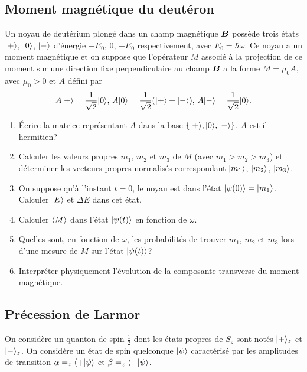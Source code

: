 \subsection{Moment magnétique du deutéron}

Un noyau de deutérium plongé dans un champ magnétique $\boldsymbol{B}$ possède
trois états $\vert+\rangle$, $\vert0\rangle $, $\vert-\rangle$ d'énergie $+E_0$, $0$, $-E_0$
respectivement, avec $E_0=\hbar\omega$. Ce noyau a un moment magnétique et on
suppose que l'opérateur $M$ associé à la projection de ce moment sur une
direction fixe perpendiculaire au champ $\boldsymbol{B}$ a la forme
$M=\mu_0A,$ avec $\mu_0>0$ et $A$ défini par%
\begin{equation}
A\vert+\rangle=\frac{1}{\sqrt{2}}\vert0\rangle,\,A\vert0\rangle=\frac{1}{\sqrt{2}}(\vert+\rangle+\vert-\rangle
),\,A\vert-\rangle =\frac{1}{\sqrt{2}}\vert0\rangle .
\end{equation}

\begin{enumerate}
\item Écrire la matrice représentant $A$ dans la base $\{\vert+\rangle,\vert0\rangle,\vert-\rangle
\}$. $A$ est-il hermitien?

\item Calculer les valeurs propres $m_1$, $m_2$ et $m_3$ de $M$ (avec
$m_1>m_2>m_3$) et déterminer les vecteurs propres normalisés correspondant 
$\vert m_1\rangle$, $\vert m_2\rangle$, $\vert m_3\rangle$.

\item On suppose qu'à l'instant $t=0$, le noyau est dans l'état
$\vert\psi(0)\rangle=\vert m_1\rangle$. Calculer $\vert E\rangle$ et $\Delta E$ dans cet état.

\item Calculer $\langle{M}\rangle$ dans l'état $\vert\psi(t)\rangle$ en fonction de $\omega$.

\item Quelles sont, en fonction de $\omega$, les probabilités de trouver
$m_1$, $m_2$ et $m_3$ lors d'une mesure de $M$ sur l'état $\vert\psi(t)\rangle$?

\item Interpréter physiquement l'évolution de la composante transverse du
moment magnétique.
\end{enumerate}

\subsection{Précession de Larmor}

On considère un quanton de spin $\frac{1}{2}$ dont les états propres de
$S_z$ sont notés $\vert+\rangle_z$ et $\vert-\rangle_z$. On considère un état de spin
quelconque $\vert\psi\rangle$ caractérisé par les amplitudes de transition
$\alpha=_z\langle+\vert\psi\rangle$ et $\beta=_z\langle-\vert\psi\rangle$.

